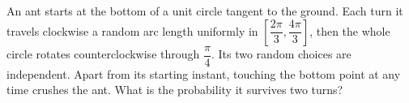 An ant starts at the bottom of a unit circle tangent to the ground. Each turn it travels clockwise a random arc length uniformly in $[\dfrac{2\pi}{3},\dfrac{4\pi}{3}]$, then the whole circle rotates counterclockwise through $\dfrac{\pi}{4}$. Its two random choices are independent. Apart from its starting instant, touching the bottom point at any time crushes the ant. What is the probability it survives two turns?
